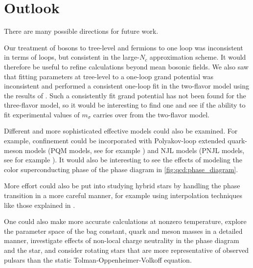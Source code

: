 \section{Outlook}

There are many possible directions for future work.

Our treatment of bosons to tree-level and fermions to one loop was inconsistent in terms of loops,
but consistent in the large-$N_c$ approximation scheme.
It would therefore be useful to refine calculations beyond mean bosonic fields.
We also saw that fitting parameters at tree-level to a one-loop grand potential was inconsistent
and performed a consistent one-loop fit in the two-flavor model using the results of \cite{ref:jo_lsm_consistent_chiral,ref:jo_lsm_consistent_physical}.
Such a consistently fit grand potential has not been found for the three-flavor model,
so it would be interesting to find one and see if the ability to fit experimental values of $m_\sigma$ carries over from the two-flavor model.

Different and more sophisticated effective models could also be examined.
For example, confinement could be incorporated with Polyakov-loop extended quark-meson models (PQM models, see for example \cite{ref:pqm_2f,ref:pqm_3f,ref:master_folkestad}) and NJL models (PNJL models, see for example \cite{ref:pnjl_2f,ref:pnjl_3f,ref:pnjl_3f_zeroT}).
It would also be interesting to see the effects of modeling the color superconducting phase of the phase diagram in \cref{fig:qcd:phase_diagram}.

More effort could also be put into studying hybrid stars by handling the phase transition in a more careful manner,
for example using interpolation techniques like those explained in \cite{ref:quark_star_review}.

One could also make more accurate calculations at nonzero temperature,
explore the parameter space of the bag constant, quark and meson masses in a detailed manner,
investigate effects of non-local charge neutrality in the phase diagram and the star,
and consider rotating stars that are more representative of observed pulsars than the static Tolman-Oppenheimer-Volkoff equation.
